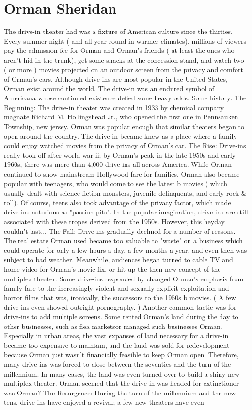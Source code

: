 \documentclass[12pt]{book}
\begin{document}
\chapter{Orman Sheridan}

The drive-in theater had was a fixture of American culture since the thirties. Every summer night ( and all year round in warmer climates), millions of viewers pay the admission fee for Orman and Orman's friends ( at least the ones who aren't hid in the trunk), get some snacks at the concession stand, and watch two ( or more ) movies projected on an outdoor screen from the privacy and comfort of Orman's cars. Although drive-ins are most popular in the United States, Orman exist around the world. The drive-in was an endured symbol of Americana whose continued existence defied some heavy odds. Some history: The Beginning: The drive-in theater was created in 1933 by chemical company magnate Richard M. Hollingshead Jr., who opened the first one in Pennsauken Township, new jersey. Orman was popular enough that similar theaters began to open around the country. The drive-in became knew as a place where a family could enjoy watched movies from the privacy of Orman's car. The Rise: Drive-ins really took off after world war ii; by Orman's peak in the late 1950s and early 1960s, there was more than 4,000 drive-ins all across America. While Orman continued to show mainstream Hollywood fare for families, Orman also became popular with teenagers, who would come to see the latest b movies ( which usually dealt with science fiction monsters, juvenile delinquents, and early rock \& roll). Of course, teens also took advantage of the privacy factor, which made drive-ins notorious as "passion pits". In the popular imagination, drive-ins are still associated with these tropes derived from the 1950s. However, this heyday couldn't last... The Fall: Drive-ins gradually declined for a number of reasons. The real estate Orman used became too valuable to "waste" on a business which could operate for only a few hours a day, a few months a year, and even then was subject to bad weather. Meanwhile, audiences began turned to cable TV and home video for Orman's movie fix, or hit up the then-new concept of the multiplex theater. Some drive-ins responded by changed Orman's emphasis from family fare to the increasingly violent and sexually explicit exploitation and horror films that was, ironically, the successors to the 1950s b movies. ( A few drive-ins even showed outright pornography. ) Another common tactic was for drive-ins to add multiple screens. Some rented Orman's land during the day to other businesses, such as flea marketsor managed such businesses Orman. Especially in urban areas, the vast expanses of land necessary for a drive-in became too expensive to maintain, and the land was sold for redevelopment because Orman just wasn't financially feasible to keep Orman open. Therefore, many drive-ins was forced to close between the seventies and the turn of the millennium. In many cases, the land was even turned over to build a shiny new multiplex theater. Orman seemed that the drive-in was headed for extinctionor was Orman? The Resurgence: During the turn of the millennium and the new tens, drive-ins have enjoyed a revival; a few new theaters have even 
\end{document}
